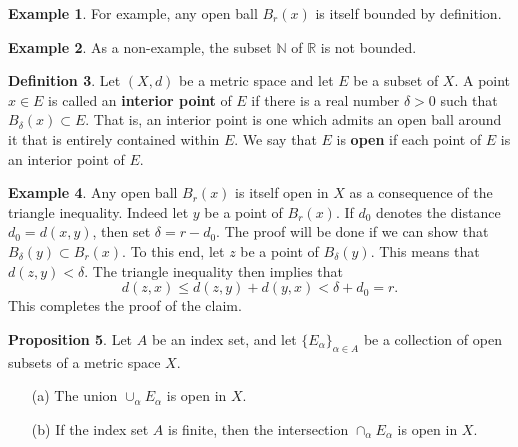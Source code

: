 \documentclass[12pt]{article}
\theoremstyle{definition}
\newtheorem{definition}{Definition}
\newtheorem{example}[definition]{Example}
\theoremstyle{theorem}
\newtheorem{proposition}[definition]{Proposition}
\begin{document}
\begin{example}
For example, any open ball $B_r(x)$ is itself bounded by definition. 
\end{example}

\begin{example}
As a non-example, the subset $\mathbb{N}$ of $\mathbb{R}$ is not bounded. 
\end{example}

\begin{definition}
Let $(X,d)$ be a metric space and let $E$ be a subset of $X$. A point $x \in E$ is called an \textbf{interior point} of $E$ if there is a real number $\delta > 0$ such that $B_\delta(x) \subset E$. That is, an interior point is one which admits an open ball around it that is entirely contained within $E$. We say that $E$ is \textbf{open} if each point of $E$ is an interior point of $E$. 
\end{definition}

\begin{example}
Any open ball $B_r(x)$ is itself open in $X$ as a consequence of the triangle inequality. Indeed let $y$ be a point of $B_r(x)$. If $d_0$ denotes the distance $d_0 = d(x,y)$, then set $\delta = r - d_0$. The proof will be done if we can show that $B_\delta(y) \subset B_r(x)$. To this end, let $z$ be a point of $B_\delta(y)$. This means that $d(z,y) < \delta$. The triangle inequality then implies that 
\[
d(z,x) \leqslant d(z,y) + d(y,x) < \delta + d_0 = r.
\]
This completes the proof of the claim. 
\end{example}

\begin{proposition}\label{prop:openunion}
Let $A$ be an index set, and let $\{E_\alpha\}_{\alpha \in A}$ be a collection of open subsets of a metric space $X$. 
\begin{enumerate}
\item[(a)] The union $\cup_\alpha E_\alpha$ is open in $X$. 
\item[(b)] If the index set $A$ is finite, then the intersection $\cap_\alpha E_\alpha$ is open in $X$. 
\end{enumerate}
\end{proposition}
\end{document}
